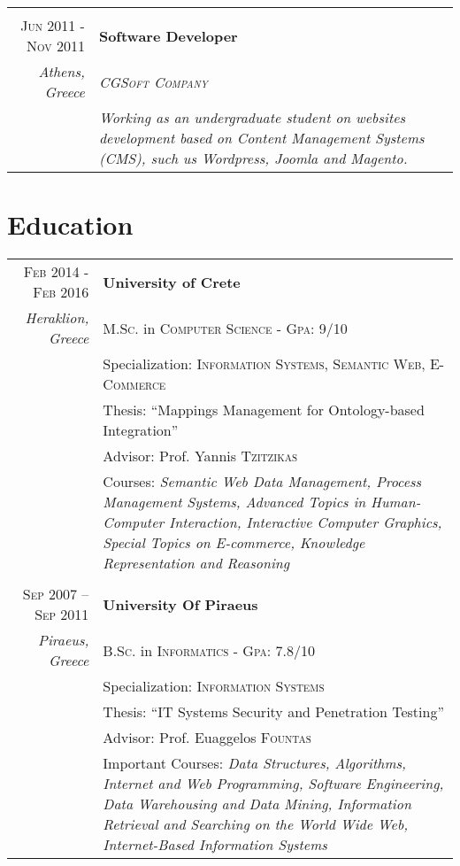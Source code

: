 \documentclass[11pt]{article}
\begin{document}
\begin{longtable}{r|p{12.5cm}}
\multicolumn{2}{c}{} \\
\textsc{Jun 2011 - Nov 2011} & \textbf{Software Developer} \\
\footnotesize{\textit{Athens, Greece}} & \emph{\textsc{CGSoft Company}} \\
& \footnotesize{\textit{Working as an undergraduate student on websites development based on Content Management Systems (CMS), such us Wordpress, Joomla and Magento.}} \\

\end{longtable}

\section{Education}

\begin{longtable}{r|p{12.5cm}}

\textsc{Feb 2014 - Feb 2016} & \textbf{University of Crete} \\
\footnotesize{\textit{Heraklion, Greece}} & \textsc{M.Sc.} in \textsc{Computer Science} - \textsc{Gpa}: 9/10\\
& Specialization: \textsc{Information Systems, Semantic Web, E-Commerce} \\
& Thesis: ``Mappings Management for Ontology-based Integration'' \\
& \footnotesize \small Advisor: Prof. Yannis \textsc{Tzitzikas}\\
& \footnotesize{Courses: 
    \textit{Semantic Web Data Management, Process Management Systems, 
    Advanced Topics in Human-Computer Interaction, Interactive Computer Graphics,
    Special Topics on E-commerce, Knowledge Representation and Reasoning}} \\

\multicolumn{2}{c}{} \\
\textsc{Sep 2007 – Sep 2011} & \textbf{University Of Piraeus} \\
\footnotesize{\textit{Piraeus, Greece}} & \textsc{B.Sc.} in \textsc{Informatics} - \textsc{Gpa}: 7.8/10 \\
& Specialization: \textsc{Information Systems} \\
& Thesis: ``IT Systems Security and Penetration Testing'' \\
& \footnotesize \small Advisor: Prof. Euaggelos \textsc{Fountas} \\
& \footnotesize{Important Courses: 
    \textit{Data Structures, Algorithms, Internet and
    Web Programming, Software Engineering, Data Warehousing
    and Data Mining, Information Retrieval and Searching on the
    World Wide Web, Internet-Based Information Systems}} \\

\end{longtable}
\end{document}
